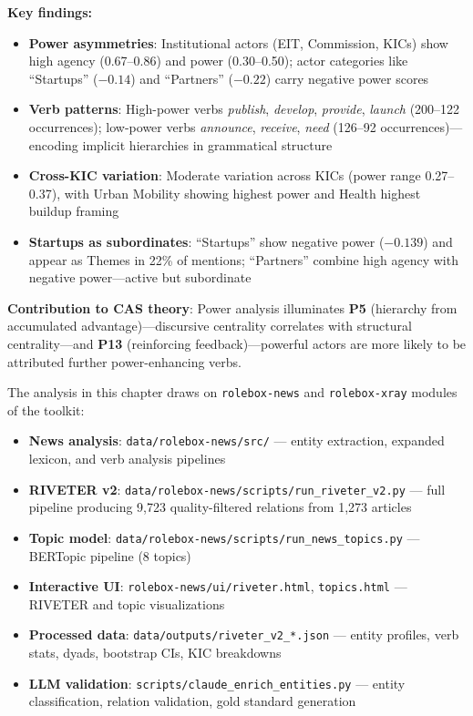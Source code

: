 \documentclass[../main.tex]{subfiles}
\begin{document}
\begin{summarybox}
\textbf{Key findings:}
\begin{itemize}[leftmargin=*, itemsep=0.1em]
\item \textbf{Power asymmetries}: Institutional actors (EIT, Commission, KICs) show high agency (0.67--0.86) and power (0.30--0.50); actor categories like ``Startups'' ($-0.14$) and ``Partners'' ($-0.22$) carry negative power scores
\item \textbf{Verb patterns}: High-power verbs \textit{publish}, \textit{develop}, \textit{provide}, \textit{launch} (200--122 occurrences); low-power verbs \textit{announce}, \textit{receive}, \textit{need} (126--92 occurrences)---encoding implicit hierarchies in grammatical structure
\item \textbf{Cross-KIC variation}: Moderate variation across KICs (power range 0.27--0.37), with Urban Mobility showing highest power and Health highest buildup framing
\item \textbf{Startups as subordinates}: ``Startups'' show negative power ($-0.139$) and appear as Themes in 22\% of mentions; ``Partners'' combine high agency with negative power---active but subordinate
\end{itemize}

\textbf{Contribution to CAS theory}: Power analysis illuminates \textbf{P5} (hierarchy from accumulated advantage)---discursive centrality correlates with structural centrality---and \textbf{P13} (reinforcing feedback)---powerful actors are more likely to be attributed further power-enhancing verbs.
\end{summarybox}

\vspace{0.5em}
\begin{replicationbox}
The analysis in this chapter draws on \texttt{rolebox-news} and \texttt{rolebox-xray} modules of the \RoleBox{} toolkit:
\begin{itemize}[leftmargin=*, itemsep=0.2em]
\item \textbf{News analysis}: \texttt{data/rolebox-news/src/} --- entity extraction, expanded lexicon, and verb analysis pipelines
\item \textbf{RIVETER v2}: \texttt{data/rolebox-news/scripts/run\_riveter\_v2.py} --- full pipeline producing 9,723 quality-filtered relations from 1,273 articles
\item \textbf{Topic model}: \texttt{data/rolebox-news/scripts/run\_news\_topics.py} --- BERTopic pipeline (8 topics)
\item \textbf{Interactive UI}: \texttt{rolebox-news/ui/riveter.html}, \texttt{topics.html} --- RIVETER and topic visualizations
\item \textbf{Processed data}: \texttt{data/outputs/riveter\_v2\_*.json} --- entity profiles, verb stats, dyads, bootstrap CIs, KIC breakdowns
\item \textbf{LLM validation}: \texttt{scripts/claude\_enrich\_entities.py} --- entity classification, relation validation, gold standard generation
\end{itemize}
\end{replicationbox}
\end{document}
